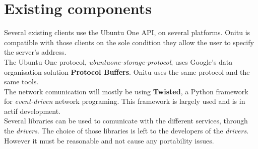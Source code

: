 \section{Existing components}
\thispagestyle{EIP} %
Several existing clients use the Ubuntu One API, on several platforms. Onitu is compatible with those clients on the sole condition they allow the user to specify the server's address.\\

The Ubuntu One protocol, \textit{ubuntuone-storage-protocol}, uses Google's data organisation solution \textbf{Protocol Buffers}. Onitu uses the same protocol and the same tools.\\

The network comunication will mostly be using \textbf{Twisted}, a Python framework for \emph{event-driven} network programing. This framework is largely used and is in actif development.\\

Several libraries can be used to comunicate with the different services, through the \textit{drivers}. The choice of those libraries is left to the developers of the \textit{drivers}. However it must be reasonable and not cause any portability issues.
